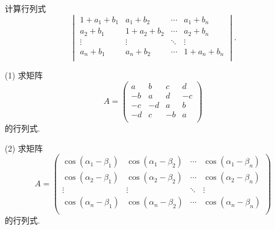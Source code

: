 \documentclass[color=black,device=normal,lang=cn,mode=geye]{elegantnote}
\begin{document}
\begin{exercisec}[4.2.11(2)]
    计算行列式
    \[\begin{vmatrix}
        1+a_1+b_1 & a_1+b_2 & \cdots & a_1+b_n \\
        a_2+b_1 & 1+a_2+b_2 & \cdots & a_2+b_n \\
        \vdots & \vdots & \ddots & \vdots \\
        a_n+b_1 & a_n+b_2 & \cdots & 1+a_n+b_n \\
    \end{vmatrix}.\]
\end{exercisec}
\begin{exercisec}[4.2.12]
    (1) 求矩阵
    \[A=\begin{pmatrix}
        a & b & c & d \\
        -b & a & d & -c \\
        -c & -d & a & b \\
        -d & c & -b & a \\
    \end{pmatrix}\]
    的行列式.

    (2) 求矩阵
    \[A=\begin{pmatrix}
        \cos(\alpha_1-\beta_1) & \cos(\alpha_1-\beta_2) & \cdots & \cos(\alpha_1-\beta_n) \\
        \cos(\alpha_2-\beta_1) & \cos(\alpha_2-\beta_2) & \cdots & \cos(\alpha_2-\beta_n) \\
        \vdots & \vdots & \ddots & \vdots \\
        \cos(\alpha_n-\beta_1) & \cos(\alpha_n-\beta_2) & \cdots & \cos(\alpha_n-\beta_n) \\
    \end{pmatrix}\]
    的行列式.
\end{exercisec}
\end{document}

